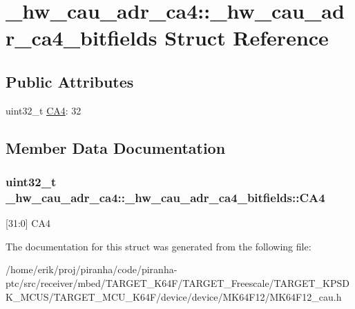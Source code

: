 \hypertarget{struct__hw__cau__adr__ca4_1_1__hw__cau__adr__ca4__bitfields}{}\section{\+\_\+hw\+\_\+cau\+\_\+adr\+\_\+ca4\+:\+:\+\_\+hw\+\_\+cau\+\_\+adr\+\_\+ca4\+\_\+bitfields Struct Reference}
\label{struct__hw__cau__adr__ca4_1_1__hw__cau__adr__ca4__bitfields}
\subsection*{Public Attributes}
\begin{DoxyCompactItemize}
\item 
uint32\+\_\+t \hyperlink{struct__hw__cau__adr__ca4_1_1__hw__cau__adr__ca4__bitfields_a81698e8746a1413b2fab15856a7824d5}{C\+A4}\+: 32
\end{DoxyCompactItemize}


\subsection{Member Data Documentation}
\subsubsection[{\texorpdfstring{C\+A4}{CA4}}]{\setlength{\rightskip}{0pt plus 5cm}uint32\+\_\+t \+\_\+hw\+\_\+cau\+\_\+adr\+\_\+ca4\+::\+\_\+hw\+\_\+cau\+\_\+adr\+\_\+ca4\+\_\+bitfields\+::\+C\+A4}\hypertarget{struct__hw__cau__adr__ca4_1_1__hw__cau__adr__ca4__bitfields_a81698e8746a1413b2fab15856a7824d5}{}\label{struct__hw__cau__adr__ca4_1_1__hw__cau__adr__ca4__bitfields_a81698e8746a1413b2fab15856a7824d5}
\mbox{[}31\+:0\mbox{]} C\+A4 

The documentation for this struct was generated from the following file\+:\begin{DoxyCompactItemize}
\item 
/home/erik/proj/piranha/code/piranha-\/ptc/src/receiver/mbed/\+T\+A\+R\+G\+E\+T\+\_\+\+K64\+F/\+T\+A\+R\+G\+E\+T\+\_\+\+Freescale/\+T\+A\+R\+G\+E\+T\+\_\+\+K\+P\+S\+D\+K\+\_\+\+M\+C\+U\+S/\+T\+A\+R\+G\+E\+T\+\_\+\+M\+C\+U\+\_\+\+K64\+F/device/device/\+M\+K64\+F12/M\+K64\+F12\+\_\+cau.\+h\end{DoxyCompactItemize}
